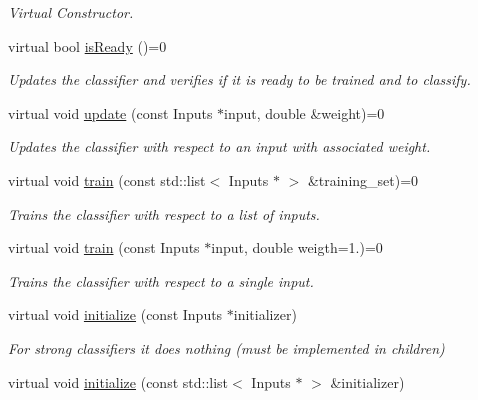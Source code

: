 \begin{DoxyCompactItemize}
\begin{DoxyCompactList}\small\item\em Virtual Constructor. \end{DoxyCompactList}\item 
virtual bool \hyperlink{classiCub_1_1boostMIL_1_1StrongClassifier_a406ccd141599b0d3c8b6dd9de6a358ba}{is\+Ready} ()=0
\begin{DoxyCompactList}\small\item\em Updates the classifier and verifies if it is ready to be trained and to classify. \end{DoxyCompactList}\item 
virtual void \hyperlink{classiCub_1_1boostMIL_1_1StrongClassifier_aabb7f754e938b0529147e55d72c7a66c}{update} (const Inputs $\ast$input, double \&weight)=0
\begin{DoxyCompactList}\small\item\em Updates the classifier with respect to an input with associated weight. \end{DoxyCompactList}\item 
virtual void \hyperlink{classiCub_1_1boostMIL_1_1StrongClassifier_a9d593cc5db61f2c615a510e8027d2b47}{train} (const std\+::list$<$ Inputs $\ast$ $>$ \&training\+\_\+set)=0
\begin{DoxyCompactList}\small\item\em Trains the classifier with respect to a list of inputs. \end{DoxyCompactList}\item 
virtual void \hyperlink{classiCub_1_1boostMIL_1_1StrongClassifier_a78e5214aaad872e3f34ff8d8f1326536}{train} (const Inputs $\ast$input, double weigth=1.)=0
\begin{DoxyCompactList}\small\item\em Trains the classifier with respect to a single input. \end{DoxyCompactList}\item 
virtual void \hyperlink{classiCub_1_1boostMIL_1_1StrongClassifier_a009ec6d067be95a012082335c1e24937}{initialize} (const Inputs $\ast$initializer)
\begin{DoxyCompactList}\small\item\em For strong classifiers it does nothing (must be implemented in children) \end{DoxyCompactList}\item 
virtual void \hyperlink{classiCub_1_1boostMIL_1_1StrongClassifier_ad6529dabd9cefe82447987b9b650e76e}{initialize} (const std\+::list$<$ Inputs $\ast$ $>$ \&initializer)

\end{DoxyCompactItemize}
